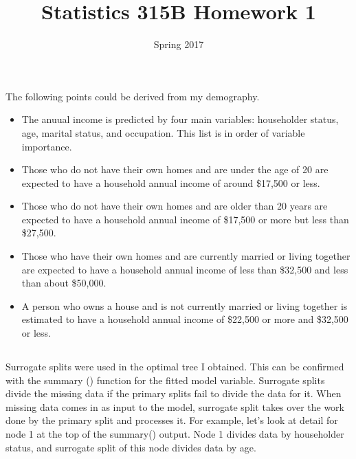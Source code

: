 \documentclass[11pt,a4paper]{article}
\begin{document}
\title{Statistics 315B Homework 1}
\author{Spring 2017}

\maketitle

\renewcommand{\thesubsection}{\thesection.\alph{subsection}}

\section{}
The following points could be derived from my demography.
\begin{itemize}
\item The anuual income is predicted by four main variables: householder status, age, marital status, and occupation. This list is in order of variable importance.
\item Those who do not have their own homes and are under the age of 20 are expected to have a household annual income of around \$17,500 or less.
\item Those who do not have their own homes and are older than 20 years are expected to have a household annual income of \$17,500 or more but less than \$27,500.
\item Those who have their own homes and are currently married or living together are expected to have a household annual income of less than \$32,500 and less than about \$50,000.
\item A person who owns a house and is not currently married or living together is estimated to have a household annual income of \$22,500 or more and \$32,500 or less.
\end{itemize}

\subsection{}
Surrogate splits were used in the optimal tree I obtained. This can be confirmed with the summary () function for the fitted model variable. Surrogate splits divide the missing data if the primary splits fail to divide the data for it. When missing data comes in as input to the model, surrogate split takes over the work done by the primary split and processes it. For example, let's look at detail for node 1 at the top of the summary() output. Node 1 divides data by householder status, and surrogate split of this node divides data by age.

\subsection{}
\end{document}
